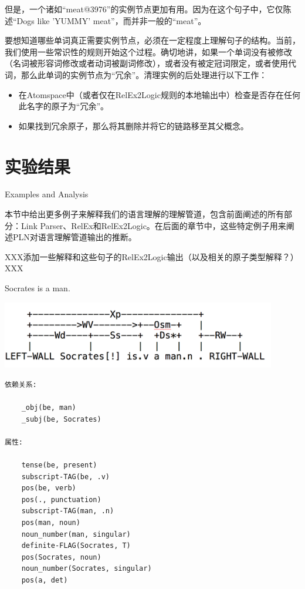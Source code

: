 但是，一个诸如“meat@3976”的实例节点更加有用。因为在这个句子中，它仅陈述“Dogs like ’YUMMY’ meat”，而并非一般的“meat”。

要想知道哪些单词真正需要实例节点，必须在一定程度上理解句子的结构。当前，我们使用一些常识性的规则开始这个过程。确切地讲，如果一个单词没有被修改（名词被形容词修改或者动词被副词修改），或者没有被定冠词限定，或者使用代词，那么此单词的实例节点为“冗余”。清理实例的后处理进行以下工作：

\begin{itemize}
\item 在Atomspace中（或者仅在RelEx2Logic规则的本地输出中）检查是否存在任何此名字的原子为“冗余”。
\item 如果找到冗余原子，那么将其删除并将它的链路移至其父概念。
\end{itemize}

\section{实验结果}{Examples and Analysis}  

本节中给出更多例子来解释我们的语言理解的理解管道，包含前面阐述的所有部分：Link Parser、RelEx和RelEx2Logic。在后面的章节中，这些特定例子用来阐述PLN对语言理解管道输出的推断。

XXX添加一些解释和这些句子的RelEx2Logic输出（以及相关的原子类型解释？）XXX

Socrates is a man.

\includegraphics[width=12cm]{figures/Socrates_1.png}

\begin{verbatim}
依赖关系:

    _obj(be, man)
    _subj(be, Socrates)

属性:

    tense(be, present)
    subscript-TAG(be, .v)
    pos(be, verb)
    pos(., punctuation)
    subscript-TAG(man, .n)
    pos(man, noun)
    noun_number(man, singular)
    definite-FLAG(Socrates, T)
    pos(Socrates, noun)
    noun_number(Socrates, singular)
    pos(a, det)

\end{verbatim}

